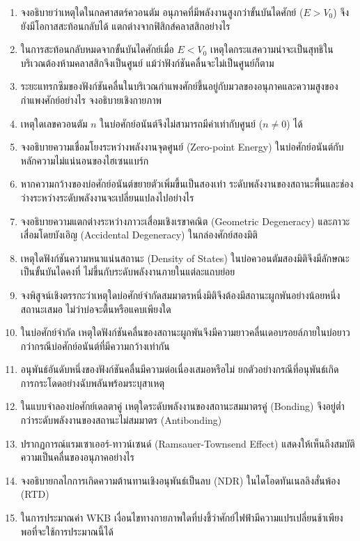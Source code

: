 \begin{enumerate}
    \item จงอธิบายว่าเหตุใดในกลศาสตร์ควอนตัม อนุภาคที่มีพลังงานสูงกว่าขั้นบันไดศักย์ ($E > V_0$) จึงยังมีโอกาสสะท้อนกลับได้ แตกต่างจากฟิสิกส์คลาสสิกอย่างไร
    \item ในการสะท้อนกลับหมดจากขั้นบันไดศักย์เมื่อ $E < V_0$ เหตุใดกระแสความน่าจะเป็นสุทธิในบริเวณต้องห้ามคลาสสิกจึงเป็นศูนย์ แม้ว่าฟังก์ชันคลื่นจะไม่เป็นศูนย์ก็ตาม
    \item ระยะแทรกซึมของฟังก์ชันคลื่นในบริเวณกำแพงศักย์ขึ้นอยู่กับมวลของอนุภาคและความสูงของกำแพงศักย์อย่างไร จงอธิบายเชิงกายภาพ
    \item เหตุใดเลขควอนตัม $n$ ในบ่อศักย์อนันต์จึงไม่สามารถมีค่าเท่ากับศูนย์ ($n \ne 0$) ได้
    \item จงอธิบายความเชื่อมโยงระหว่างพลังงานจุดศูนย์ (Zero-point Energy) ในบ่อศักย์อนันต์กับหลักความไม่แน่นอนของไฮเซนแบร์ก
    \item หากความกว้างของบ่อศักย์อนันต์ขยายตัวเพิ่มขึ้นเป็นสองเท่า ระดับพลังงานของสถานะพื้นและช่องว่างระหว่างระดับพลังงานจะเปลี่ยนแปลงไปอย่างไร
    \item จงอธิบายความแตกต่างระหว่างภาวะเสื่อมเชิงเรขาคณิต (Geometric Degeneracy) และภาวะเสื่อมโดยบังเอิญ (Accidental Degeneracy) ในกล่องศักย์สองมิติ
    \item เหตุใดฟังก์ชันความหนาแน่นสถานะ (Density of States) ในบ่อควอนตัมสองมิติจึงมีลักษณะเป็นขั้นบันไดคงที่ ไม่ขึ้นกับระดับพลังงานภายในแต่ละแถบย่อย
    \item จงพิสูจน์เชิงตรรกะว่าเหตุใดบ่อศักย์จำกัดสมมาตรหนึ่งมิติจึงต้องมีสถานะผูกพันอย่างน้อยหนึ่งสถานะเสมอ ไม่ว่าบ่อจะตื้นหรือแคบเพียงใด
    \item ในบ่อศักย์จำกัด เหตุใดฟังก์ชันคลื่นของสถานะผูกพันจึงมีความยาวคลื่นเดอบรอยล์ภายในบ่อยาวกว่ากรณีบ่อศักย์อนันต์ที่มีความกว้างเท่ากัน
    \item อนุพันธ์อันดับหนึ่งของฟังก์ชันคลื่นมีความต่อเนื่องเสมอหรือไม่ ยกตัวอย่างกรณีที่อนุพันธ์เกิดการกระโดดอย่างฉับพลันพร้อมระบุสาเหตุ
    \item ในแบบจำลองบ่อศักย์เดลตาคู่ เหตุใดระดับพลังงานของสถานะสมมาตรคู่ (Bonding) จึงอยู่ต่ำกว่าระดับพลังงานของสถานะไม่สมมาตร (Antibonding)
    \item ปรากฏการณ์แรมเซาเออร์-ทาวน์เซนด์ (Ramsauer-Townsend Effect) แสดงให้เห็นถึงสมบัติความเป็นคลื่นของอนุภาคอย่างไร
    \item จงอธิบายกลไกการเกิดความต้านทานเชิงอนุพันธ์เป็นลบ (NDR) ในไดโอดทันเนลลิงสั่นพ้อง (RTD)
    \item ในการประมาณค่า WKB เงื่อนไขทางกายภาพใดที่บ่งชี้ว่าศักย์ไฟฟ้ามีความแปรเปลี่ยนช้าเพียงพอที่จะใช้การประมาณนี้ได้

\end{enumerate}
